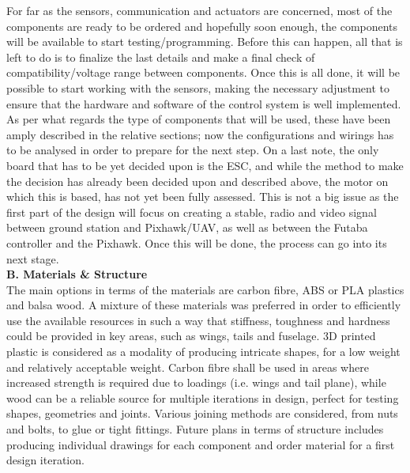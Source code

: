 \documentclass[12pt]{article}
\begin{document}
\noindent For far as the sensors, communication and actuators are concerned, most of the components are ready to be ordered and hopefully soon enough, the components will be available to start testing/programming. Before this can happen, all that is left to do is to finalize the last details and make a final check of compatibility/voltage range between components. Once this is all done, it will be possible to start working with the sensors, making the necessary adjustment to ensure that the hardware and software of the control system is well implemented. As per what regards the type of components that will be used, these have been amply described in the relative sections; now the configurations and wirings has to be analysed in order to prepare for the next step. On a last note, the only board that has to be yet decided upon is the ESC, and while the method to make the decision has already been decided upon and described above, the motor on which this is based, has not yet been fully assessed. This is not a big issue as the first part of the design will focus on creating a stable, radio and video signal between ground station and Pixhawk/UAV, as well as between the Futaba controller and the Pixhawk. Once this will be done, the process can go into its next stage. \\

\noindent \textbf{B. Materials \& Structure}\\
\noindent The main options in terms of the materials are carbon fibre, ABS or PLA plastics and balsa wood. A mixture of these materials was preferred in order to efficiently use the available resources in such a way that stiffness, toughness and hardness could be provided in key areas, such as wings, tails and fuselage. 3D printed plastic is considered as a modality of producing intricate shapes, for a low weight and relatively acceptable weight. Carbon fibre shall be used in areas where increased strength is required due to loadings (i.e. wings and tail plane), while wood can be a reliable source for multiple iterations in design, perfect for testing shapes, geometries and joints. Various joining methods are considered, from nuts and bolts, to glue or tight fittings. Future plans in terms of structure includes producing individual drawings for each component and order material for a first design iteration. \\
\end{document}
